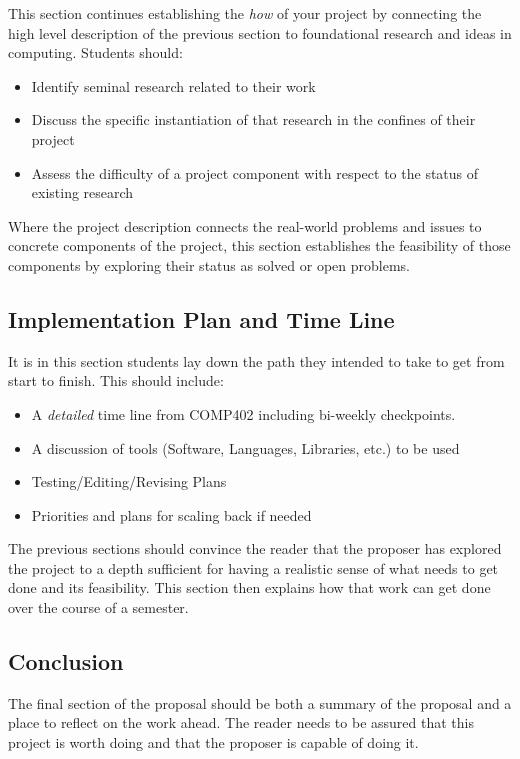 \documentclass[10pt]{article}
\begin{document}
This section continues establishing the \textit{how} of your project by connecting the high level description of the previous section to foundational research and ideas in computing. Students should:
\begin{itemize}
\item Identify seminal research related to their work
\item Discuss the specific instantiation of that research in the confines of their project
\item Assess the difficulty of a project component with respect to the status of existing research
\end{itemize}
Where the project description connects the real-world problems and issues to concrete components of the project, this section establishes the feasibility of those components by exploring their status as solved or open problems. 


\subsection{Implementation Plan and Time Line}

It is in this section students lay down the path they intended to take to get from start to finish. This should include:
\begin{itemize} 
\item A \textit{detailed} time line from COMP402 including bi-weekly checkpoints.
\item A discussion of tools (Software, Languages, Libraries, etc.) to be used
\item Testing/Editing/Revising Plans 
\item Priorities and plans for scaling back if needed
\end{itemize}
The previous sections should convince the reader that the proposer has explored the project to a depth sufficient for having a realistic sense of what needs to get done and its feasibility. This section then explains how that work can get done over the course of a semester. 


\subsection{Conclusion}

The final section of the proposal should be both a summary of the proposal and a place to reflect on the work ahead. The reader needs to be assured that this project is worth doing and that the proposer is capable of doing it. 
\end{document}
